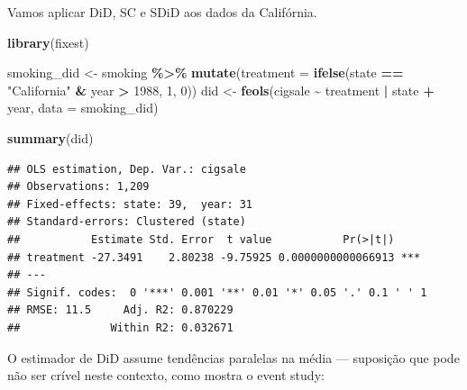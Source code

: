 \documentclass[
]{article}
\newenvironment{Shaded}{\begin{snugshade}}{\end{snugshade}}
\newcommand{\AttributeTok}[1]{\textcolor[rgb]{0.13,0.29,0.53}{#1}}
\newcommand{\DecValTok}[1]{\textcolor[rgb]{0.00,0.00,0.81}{#1}}
\newcommand{\FunctionTok}[1]{\textcolor[rgb]{0.13,0.29,0.53}{\textbf{#1}}}
\newcommand{\NormalTok}[1]{#1}
\newcommand{\OtherTok}[1]{\textcolor[rgb]{0.56,0.35,0.01}{#1}}
\newcommand{\SpecialCharTok}[1]{\textcolor[rgb]{0.81,0.36,0.00}{\textbf{#1}}}
\newcommand{\StringTok}[1]{\textcolor[rgb]{0.31,0.60,0.02}{#1}}
\begin{document}
Vamos aplicar DiD, SC e SDiD aos dados da Califórnia.

\begin{Shaded}
\begin{Highlighting}[]
\FunctionTok{library}\NormalTok{(fixest)}

\NormalTok{smoking\_did }\OtherTok{\textless{}{-}}\NormalTok{ smoking }\SpecialCharTok{\%\textgreater{}\%}
  \FunctionTok{mutate}\NormalTok{(}\AttributeTok{treatment =} \FunctionTok{ifelse}\NormalTok{(state }\SpecialCharTok{==} \StringTok{"California"} \SpecialCharTok{\&}\NormalTok{ year }\SpecialCharTok{\textgreater{}} \DecValTok{1988}\NormalTok{, }\DecValTok{1}\NormalTok{, }\DecValTok{0}\NormalTok{))}
\NormalTok{did }\OtherTok{\textless{}{-}} \FunctionTok{feols}\NormalTok{(cigsale }\SpecialCharTok{\textasciitilde{}}\NormalTok{ treatment }\SpecialCharTok{|}\NormalTok{ state }\SpecialCharTok{+}\NormalTok{ year, }\AttributeTok{data =}\NormalTok{ smoking\_did)}

\FunctionTok{summary}\NormalTok{(did)}
\end{Highlighting}
\end{Shaded}

\begin{verbatim}
## OLS estimation, Dep. Var.: cigsale
## Observations: 1,209
## Fixed-effects: state: 39,  year: 31
## Standard-errors: Clustered (state) 
##           Estimate Std. Error  t value           Pr(>|t|)    
## treatment -27.3491    2.80238 -9.75925 0.0000000000066913 ***
## ---
## Signif. codes:  0 '***' 0.001 '**' 0.01 '*' 0.05 '.' 0.1 ' ' 1
## RMSE: 11.5     Adj. R2: 0.870229
##              Within R2: 0.032671
\end{verbatim}

O estimador de DiD assume tendências paralelas na média --- suposição que pode não ser crível neste contexto, como mostra o event study:
\end{document}

